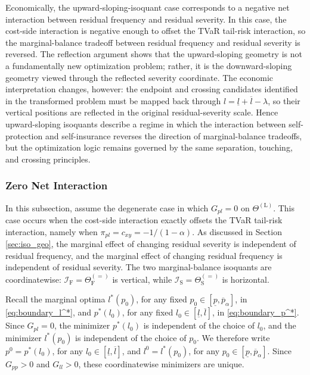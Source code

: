 \documentclass[a4paper,12pt]{article}
\begin{document}
Economically, the upward-sloping-isoquant case corresponds to a negative net interaction between residual frequency and residual severity. In this case, the cost-side interaction is negative enough to offset the TVaR tail-risk interaction, so the marginal-balance tradeoff between residual frequency and residual severity is reversed. The reflection argument shows that the upward-sloping geometry is not a fundamentally new optimization problem; rather, it is the downward-sloping geometry viewed through the reflected severity coordinate. The economic interpretation changes, however: the endpoint and crossing candidates identified in the transformed problem must be mapped back through $l=\underline{l}+\overline{l}-\lambda$, so their vertical positions are reflected in the original residual-severity scale. Hence upward-sloping isoquants describe a regime in which the interaction between self-protection and self-insurance reverses the direction of marginal-balance tradeoffs, but the optimization logic remains governed by the same separation, touching, and crossing principles.

\subsubsection{Zero Net Interaction}\label{sec:zero_net}

In this subsection, assume the degenerate case in which $G_{pl}=0$ on $\Theta^{\left(\text{L}\right)}$. This case occurs when the cost-side interaction exactly offsets the TVaR tail-risk interaction, namely when $\pi_{pl}=c_{xy}=-1/\left(1-\alpha\right)$. As discussed in Section \ref{sec:iso_geo}, the marginal effect of changing residual severity is independent of residual frequency, and the marginal effect of changing residual frequency is independent of residual severity. The two marginal-balance isoquants are coordinatewise: $\mathcal{I}_{\text{F}}=\Theta_{\text{F}}^{\left(=\right)}$ is vertical, while $\mathcal{I}_{\text{S}}=\Theta_{\text{S}}^{\left(=\right)}$ is horizontal.

Recall the marginal optima $l^*\left(p_0\right)$, for any fixed $p_0\in\left[\underline{p},\overline{p}_{\alpha}\right]$, in \eqref{eq:boundary_l^*}, and $p^*\left(l_0\right)$, for any fixed $l_0\in\left[\underline{l},\overline{l}\right]$, in \eqref{eq:boundary_p^*}. Since $G_{pl}=0$, the minimizer $p^*\left(l_0\right)$ is independent of the choice of $l_0$, and the minimizer $l^*\left(p_0\right)$ is independent of the choice of $p_0$. We therefore write $p^0=p^*\left(l_0\right)$, for any $l_0\in\left[\underline{l},\overline{l}\right]$, and $l^0=l^*\left(p_0\right)$, for any $p_0\in\left[\underline{p},\overline{p}_{\alpha}\right]$. Since $G_{pp}>0$ and $G_{ll}>0$, these coordinatewise minimizers are unique.
\end{document}
